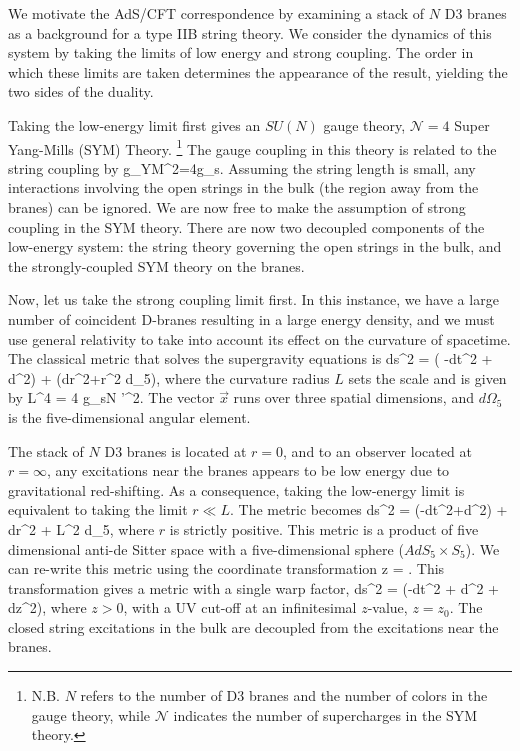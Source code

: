 We motivate the AdS/CFT correspondence by examining a stack of $N$ D3 branes as a background for a type IIB string theory.
We consider the dynamics of this system by taking the limits of low energy and strong coupling. 
The order in which these limits are taken determines the appearance of the result, yielding the two sides of the duality.

Taking the low-energy limit first gives an $SU(N)$ gauge theory, $\mathcal{N} =4 $ Super Yang-Mills (SYM) Theory. 
\footnote{N.B.  $N$ refers to the number of D3 branes and the number of colors in the gauge theory, while $\mathcal{N}$ indicates the number of supercharges in the SYM theory.}
The gauge coupling in this theory is related to the string coupling by
\be
g_{YM}^2=4\pi g_s.
\label{eq:gYM}
\ee
Assuming the string length is small, any interactions involving the open strings in the bulk (the region away from the branes) can be ignored.
We are now free to make the assumption of strong coupling in the SYM theory.
There are now two decoupled components of the low-energy system: the string theory governing the open strings in the bulk, and the strongly-coupled SYM theory on the branes.

Now, let us take the strong coupling limit first. 
In this instance, we have a large number of coincident D-branes resulting in a large energy density, and we must use general relativity to take into account its effect on the curvature of spacetime.
The classical metric that solves the supergravity equations is
\be
 \label{equSGmetric}
ds^{2} = \left( -dt^{2} + d^{2}\right) + (dr^{2}+r^2 d\Omega_5),
\ee
where the curvature radius $L$ sets the scale and is given by\cite{Witten:1995im,Horowitz:1991cd}
\be
L^{4} = 4 \pi g_{s}N \alpha'^{2}.
\label{eq:L4}
\ee
The vector $\vec{x}$ runs over three spatial dimensions, and $d\Omega_5$ is the five-dimensional angular element.

The stack of $N$ D3 branes is located at $r=0$, and to an observer located at $r=\infty$, any excitations near the branes appears to be low energy due to gravitational red-shifting.
As a consequence, taking the low-energy limit is equivalent to taking the limit $r \ll L$.
The metric becomes
\be
\label{equ10drmetric}
ds^{2} =  (-dt^{2}+d^{2}) + dr^{2} + L^2 d\Omega_{5},
\ee
where $r$ is strictly positive.
This metric is a product of five dimensional anti-de Sitter space with a five-dimensional sphere ($AdS_5\times S_5$).
We can re-write this metric using the coordinate transformation
\be
z = .
\ee
This transformation gives a metric with a single warp factor,
\be
\label{equ5dzmetric}
ds^{2} = \left(-dt^{2} + d^{2} + dz^{2}\right),
\ee
where  $z>0$, with a UV cut-off at an infinitesimal $z$-value, $z=z_0$.  
The closed string excitations in the bulk are decoupled from the excitations near the branes.

